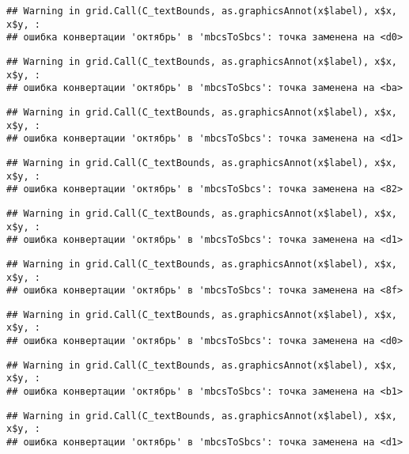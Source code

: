 \documentclass[
]{article}
\begin{document}
\begin{verbatim}
## Warning in grid.Call(C_textBounds, as.graphicsAnnot(x$label), x$x, x$y, :
## ошибка конвертации 'октябрь' в 'mbcsToSbcs': точка заменена на <d0>
\end{verbatim}

\begin{verbatim}
## Warning in grid.Call(C_textBounds, as.graphicsAnnot(x$label), x$x, x$y, :
## ошибка конвертации 'октябрь' в 'mbcsToSbcs': точка заменена на <ba>
\end{verbatim}

\begin{verbatim}
## Warning in grid.Call(C_textBounds, as.graphicsAnnot(x$label), x$x, x$y, :
## ошибка конвертации 'октябрь' в 'mbcsToSbcs': точка заменена на <d1>
\end{verbatim}

\begin{verbatim}
## Warning in grid.Call(C_textBounds, as.graphicsAnnot(x$label), x$x, x$y, :
## ошибка конвертации 'октябрь' в 'mbcsToSbcs': точка заменена на <82>
\end{verbatim}

\begin{verbatim}
## Warning in grid.Call(C_textBounds, as.graphicsAnnot(x$label), x$x, x$y, :
## ошибка конвертации 'октябрь' в 'mbcsToSbcs': точка заменена на <d1>
\end{verbatim}

\begin{verbatim}
## Warning in grid.Call(C_textBounds, as.graphicsAnnot(x$label), x$x, x$y, :
## ошибка конвертации 'октябрь' в 'mbcsToSbcs': точка заменена на <8f>
\end{verbatim}

\begin{verbatim}
## Warning in grid.Call(C_textBounds, as.graphicsAnnot(x$label), x$x, x$y, :
## ошибка конвертации 'октябрь' в 'mbcsToSbcs': точка заменена на <d0>
\end{verbatim}

\begin{verbatim}
## Warning in grid.Call(C_textBounds, as.graphicsAnnot(x$label), x$x, x$y, :
## ошибка конвертации 'октябрь' в 'mbcsToSbcs': точка заменена на <b1>
\end{verbatim}

\begin{verbatim}
## Warning in grid.Call(C_textBounds, as.graphicsAnnot(x$label), x$x, x$y, :
## ошибка конвертации 'октябрь' в 'mbcsToSbcs': точка заменена на <d1>
\end{verbatim}
\end{document}

